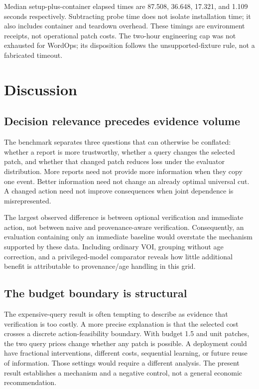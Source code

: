 \documentclass[manuscript,screen,nonacm]{acmart}
\begin{document}
Median setup-plus-container elapsed times are 87.508, 36.648, 17.321, and 1.109 seconds respectively. Subtracting probe time does not isolate installation time; it also includes container and teardown overhead. These timings are environment receipts, not operational patch costs. The two-hour engineering cap was not exhausted for WordOps; its disposition follows the unsupported-fixture rule, not a fabricated timeout.

\section{Discussion}
\subsection{Decision relevance precedes evidence volume}
The benchmark separates three questions that can otherwise be conflated: whether a report is more trustworthy, whether a query changes the selected patch, and whether that changed patch reduces loss under the evaluator distribution. More reports need not provide more information when they copy one event. Better information need not change an already optimal universal cut. A changed action need not improve consequences when joint dependence is misrepresented.

The largest observed difference is between optional verification and immediate action, not between naive and provenance-aware verification. Consequently, an evaluation containing only an immediate baseline would overstate the mechanism supported by these data. Including ordinary VOI, grouping without age correction, and a privileged-model comparator reveals how little additional benefit is attributable to provenance/age handling in this grid.

\subsection{The budget boundary is structural}
The expensive-query result is often tempting to describe as evidence that verification is too costly. A more precise explanation is that the selected cost crosses a discrete action-feasibility boundary. With budget 1.5 and unit patches, the two query prices change whether any patch is possible. A deployment could have fractional interventions, different costs, sequential learning, or future reuse of information. Those settings would require a different analysis. The present result establishes a mechanism and a negative control, not a general economic recommendation.
\end{document}
